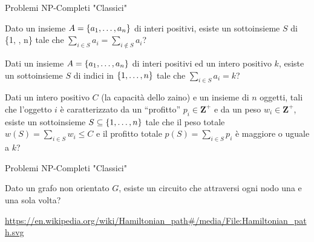 \begin{frame}{Problemi NP-Completi "Classici"}

\small
\vspace{-9pt}
\begin{myboxtitle}
Dato un insieme $A = \{ a_1, \ldots, a_n\}$ di interi positivi, esiste un
sottoinsieme $S$ di \{1, \mldots, n\} tale che $\sum_{i\in S} a_i = \sum_{i
\notin S}a_i$?
\end{myboxtitle}

\begin{myboxtitle}
Dati un insieme $A = \{ a_1 , \ldots, a_n\}$ di interi positivi ed un intero
positivo $k$, esiste un sottoinsieme $S$ di indici in $\{1, \ldots, n\}$ tale
che $\sum_{i \in S} a_i = k$?
\end{myboxtitle}

\begin{myboxtitle}
Dati un intero positivo $C$ (la capacità dello zaino) e un insieme di $n$ oggetti, tali che l'oggetto $i$ è caratterizzato da un ``profitto'' $p_i \in \mathbf{Z}^+$ e da un peso $w_i \in \mathbf{Z}^+$, esiste un sottoinsieme $S \subseteq \{ 1, \ldots, n \}$ tale che il peso totale $w(S) = \sum_{i \in S} w_i \le C$ e il profitto totale $p(S) = \sum_{i \in S} p_i$ è maggiore o uguale a $k$?
\end{myboxtitle}

\end{frame}

\begin{frame}{Problemi NP-Completi "Classici"}

\vspace{-9pt}
\begin{myboxtitle}
Dato un grafo non orientato $G$, esiste un circuito che attraversi ogni nodo
una e una sola volta?
\end{myboxtitle}

\begin{center}
\end{center}

\vfill
\tiny
\url{https://en.wikipedia.org/wiki/Hamiltonian\_path\#/media/File:Hamiltonian\_path.svg}

\end{frame}

